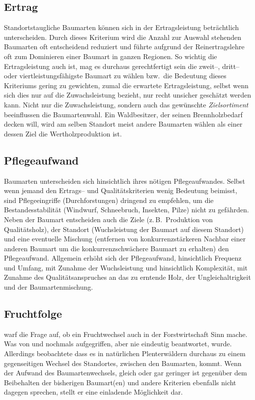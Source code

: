 \documentclass[twocolumn]{scrartcl}
\begin{document}
\subsection{Ertrag}
\label{ssec:ertrag}

Standortstaugliche Baumarten können sich in der Ertragsleistung
beträchtlich unterscheiden. Durch dieses Kriterium wird die Anzahl zur
Auswahl stehenden Baumarten oft entscheidend reduziert und führte
aufgrund der Reinertragslehre oft zum Dominieren einer Baumart in
ganzen Regionen. So wichtig die Ertragsleistung auch ist, mag es
durchaus gerechtfertigt sein die zweit--, dritt-- oder
viertleistungsfähigste Baumart zu wählen bzw.\ die Bedeutung dieses
Kriteriums gering zu gewichten, zumal die erwartete Ertragsleistung,
selbst wenn sich dies nur auf die Zuwachsleistung bezieht, nur recht
unsicher geschätzt werden kann. Nicht nur die Zuwachsleistung, sondern
auch das gewünschte \emph{Zielsortiment} beeinflussen die
Baumartenwahl. Ein Waldbesitzer, der seinen Brennholzbedarf decken
will, wird am selben Standort meist andere Baumarten wählen als einer
dessen Ziel die Wertholzproduktion ist.

\subsection{Pflegeaufwand}
\label{ssec:pflegeaufwand}

Baumarten unterscheiden sich hinsichtlich ihres nötigen
Pflegeaufwandes. Selbst wenn jemand den Ertrags-- und
Qualitätskriterien wenig Bedeutung beimisst, sind Pflegeeingriffe
(Durchforstungen) dringend zu empfehlen, um die Bestandesstabilität
(Windwurf, Schneebruch, Insekten, Pilze) nicht zu gefährden. Neben der
Baumart entscheiden auch die Ziele (z.\,B.\ Produktion von
Qualitätsholz), der Standort (Wuchsleistung der Baumart auf diesem
Standort) und eine eventuelle Mischung (entfernen von
konkurrenzstärkeren Nachbar einer anderen Baumart um die
konkurrenzschwächere Baumart zu erhalten) den Pflegeaufwand. Allgemein
erhöht sich der Pflegeaufwand, hinsichtlich Frequenz und Umfang, mit
Zunahme der Wuchsleistung und hinsichtlich Komplexität, mit Zunahme
des Qualitätsanspruches an das zu erntende Holz, der
Ungleichaltrigkeit und der Baumartenmischung.

\subsection{Fruchtfolge}
\label{ssec:Fruchtfolge}

\cite{jentsch1911fruchtwechsel} warf die Frage auf, ob ein
Fruchtwechsel auch in der Forstwirtschaft Sinn mache. Was von
\cite{sieber1919Holzartenwechsel} und
\cite{fabricius1924Holzartenwechsel} nochmals aufgegriffen, aber nie
eindeutig beantwortet, wurde. Allerdings beobachtete
\cite{simak1951Baumartenwechsel} dass es in natürlichen Plenterwäldern
durchaus zu einem gegenseitigen Wechsel des Standortes, zwischen den
Baumarten, kommt. Wenn der Aufwand des Baumartenwechsels, gleich oder
gar geringer ist gegenüber dem Beibehalten der bisherigen Baumart(en)
und andere Kriterien ebenfalls nicht dagegen sprechen, stellt er eine
einladende Möglichkeit dar.
\end{document}
